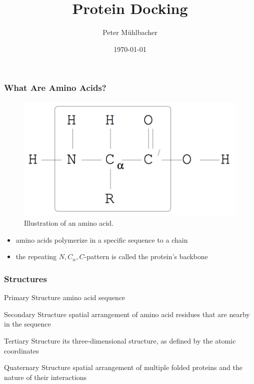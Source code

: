 \documentclass{beamer}
\title[Protein Docking]{Protein Docking}
\author{Peter M\"uhlbacher}
\date{\today}
\begin{document}
\begin{frame}
\titlepage
\end{frame}


\begin{frame}
\frametitle{What Are Amino Acids?}

\begin{figure}
\caption{Illustration of an amino acid. \cite{neumaier}}
\includegraphics[width=0.7\linewidth]{aminoacid.png}
\end{figure}

\begin{itemize}
	\item amino acids polymerize in a specific sequence to a chain
	\item the repeating $N,C_\alpha,C$-pattern is called the protein's backbone
\end{itemize}

\end{frame}


\begin{frame}
\frametitle{Structures}

\begin{block}{Primary Structure}
amino acid sequence
\end{block}

\begin{block}{Secondary Structure}
spatial arrangement of amino acid residues that are nearby in the sequence
\end{block}

\begin{block}{Tertiary Structure}
its three-dimensional structure, as defined by the atomic coordinates
\end{block}

\begin{block}{Quaternary Structure}
spatial arrangement of multiple folded proteins and the nature of their interactions \cite{berg}
\end{block}


\end{frame}
\end{document}
